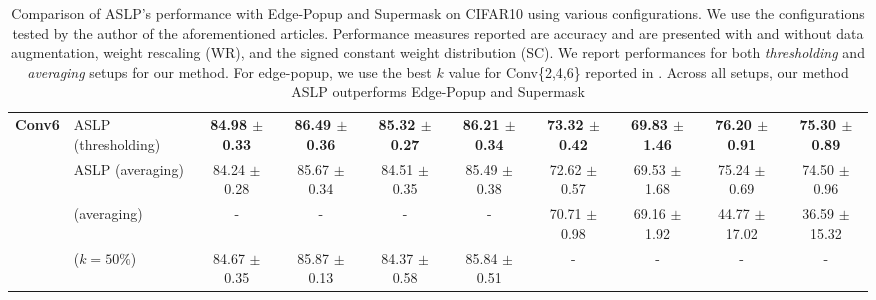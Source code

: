 \begin{table}[htbp]
{\begin{tabular}{llcccccccc}
       \multirow{4}{*}{\textbf{Conv6}} & ASLP (thresholding) & \textbf{84.98 $\pm$ 0.33} & \textbf{86.49 $\pm$ 0.36} & \textbf{85.32 $\pm$ 0.27} & \textbf{86.21 $\pm$ 0.34} & \textbf{73.32 $\pm$ 0.42} & \textbf{69.83 $\pm$ 1.46} & \textbf{76.20 $\pm$ 0.91} & \textbf{75.30 $\pm$ 0.89} \\
        & ASLP (averaging)& 84.24 $\pm$ 0.28 & 85.67 $\pm$ 0.34 & 84.51 $\pm$ 0.35 & 85.49 $\pm$ 0.38 & 72.62 $\pm$ 0.57 & 69.53 $\pm$ 1.68 & 75.24 $\pm$ 0.69 & 74.50 $\pm$ 0.96 \\
        & \cite{DBLP:conf/nips/ZhouLLY19} (averaging) & - & - & - & - & 70.71 $\pm$ 0.98 & 69.16 $\pm$ 1.92 & 44.77 $\pm$ 17.02 & 36.59 $\pm$ 15.32 \\
        & \cite{DBLP:conf/cvpr/RamanujanWKFR20} ($k=50\%$) & 84.67 $\pm$ 0.35 & 85.87 $\pm$ 0.13 & 84.37 $\pm$ 0.58 & 85.84 $\pm$ 0.51 & - & - & - & - \\
      \bottomrule
    \end{tabular}
  }
  \caption{Comparison of ASLP's performance with Edge-Popup and Supermask
  \cite{DBLP:conf/cvpr/RamanujanWKFR20,DBLP:conf/nips/ZhouLLY19} on CIFAR10
  using various configurations. We use the configurations tested by the author
  of the aforementioned articles. Performance measures reported are accuracy and
  are presented with and without data augmentation, weight rescaling (WR), and
  the signed constant weight distribution (SC). We report performances for both
  \textit{thresholding} and \textit{averaging} setups for our method. For edge-popup, we use
  the best $k$ value for Conv\{2,4,6\} reported in
  \cite{DBLP:conf/cvpr/RamanujanWKFR20}.  Across all setups, our method ASLP
  outperforms Edge-Popup and Supermask}
  \label{tab:chap2:con_performances_comparison_cifar10}
  
\end{table}



